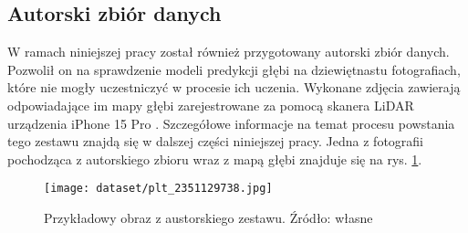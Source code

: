 \subsection{Autorski zbiór danych}
W ramach niniejszej pracy został również przygotowany autorski zbiór danych. Pozwolił on na sprawdzenie modeli predykcji głębi na dziewiętnastu fotografiach, które nie mogły uczestniczyć w procesie ich uczenia. Wykonane zdjęcia zawierają odpowiadające im mapy głębi zarejestrowane za pomocą skanera LiDAR urządzenia iPhone 15 Pro \cite{chase2022apple}. Szczegółowe informacje na temat procesu powstania tego zestawu znajdą się w dalszej części niniejszej pracy. Jedna z fotografii pochodząca z autorskiego zbioru wraz z mapą głębi znajduje się na rys. \ref{fig:stray-example}.
\begin{figure}[H]
    \centering
    \texttt{[image: dataset/plt\_2351129738.jpg]}
    \caption{Przykładowy obraz z austorskiego zestawu. Źródło: własne}
    \label{fig:stray-example}
\end{figure}

